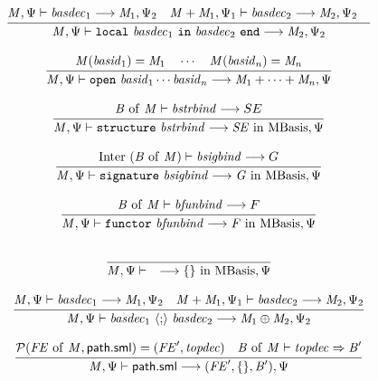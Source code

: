 \begin{equation}
{\frac{\displaystyle\strut{
\mathit{M}, \Psi  \vdash \mathit{basdec}_1 \longrightarrow \mathit{M}_1, \Psi_2 \quad
\mathit{M} + \mathit{M}_1, \Psi_1  \vdash \mathit{basdec}_2 \longrightarrow \mathit{M}_2, \Psi_2 \quad
}}{\displaystyle\strut{
\mathit{M}, \Psi  \vdash \mathtt{local}~ \mathit{basdec}_1 ~\mathtt{in}~ \mathit{basdec}_2 ~\mathtt{end} \longrightarrow \mathit{M}_2, \Psi_2
}}}
\end{equation}

\begin{equation}
{\frac{\displaystyle\strut{
\mathit{M}(\mathit{basid}_1) = \mathit{M}_1 \quad \cdots \quad
\mathit{M}(\mathit{basid}_n) = \mathit{M}_n 
}}{\displaystyle\strut{
\mathit{M}, \Psi  \vdash \mathtt{open}~ \mathit{basid}_1 \cdots \mathit{basid}_n \longrightarrow \mathit{M}_1 + \cdots + \mathit{M}_n, \Psi
}}}
\end{equation}

\begin{equation}
{\frac{\displaystyle\strut{
\mathit{B}~\mathrm{of}~\mathit{M} \vdash \mathit{bstrbind} \longrightarrow SE
}}{\displaystyle\strut{
\mathit{M}, \Psi  \vdash \mathtt{structure}~ \mathit{bstrbind}
\longrightarrow \mathit{SE} ~\mathrm{in}~ \mathrm{MBasis}, \Psi
}}}
\end{equation}

\begin{equation}
{\frac{\displaystyle\strut{
\mathrm{Inter}~(\mathit{B}~\mathrm{of}~\mathit{M}) \vdash \mathit{bsigbind} \longrightarrow G
}}{\displaystyle\strut{
\mathit{M}, \Psi  \vdash \mathtt{signature}~ \mathit{bsigbind}
\longrightarrow \mathit{G } ~\mathrm{in}~ \mathrm{MBasis}, \Psi
}}}
\end{equation}

\begin{equation}
{\frac{\displaystyle\strut{
\mathit{B}~\mathrm{of}~\mathit{M} \vdash \mathit{bfunbind} \longrightarrow F
}}{\displaystyle\strut{
\mathit{M}, \Psi  \vdash \mathtt{functor}~ \mathit{bfunbind}
\longrightarrow \mathit{F} ~\mathrm{in}~ \mathrm{MBasis}, \Psi
}}}
\end{equation}

\begin{equation}
{\frac{\displaystyle\strut{
}}{\displaystyle\strut{
\mathit{M}, \Psi  \vdash \quad \longrightarrow \{\} ~\mathrm{in}~ \mathrm{MBasis}, \Psi
}}}
\end{equation}

\begin{equation}
{\frac{\displaystyle\strut{
\mathit{M}, \Psi  \vdash \mathit{basdec}_1 \longrightarrow \mathit{M}_1, \Psi_2 \quad
\mathit{M} + \mathit{M}_1, \Psi_1  \vdash \mathit{basdec}_2 \longrightarrow \mathit{M}_2, \Psi_2 
}}{\displaystyle\strut{
\mathit{M}, \Psi  \vdash \mathit{basdec}_1 ~\langle\mathtt{;}\rangle~ \mathit{basdec}_2 \longrightarrow \mathit{M}_1 \oplus \mathit{M}_2, \Psi_2
}}}
\end{equation}

\begin{equation}
{\frac{\displaystyle\strut{
\mathcal{P}(\mathit{FE}~\mathrm{of}~\mathit{M}, \mathsf{path.sml}) = (\mathit{FE}', \mathit{topdec}) \quad
\mathit{B}~\mathrm{of}~\mathit{M} \vdash \mathit{topdec} \Rightarrow \mathit{B}'
}}{\displaystyle\strut{
\mathit{M}, \Psi  \vdash \mathsf{path.sml}  \longrightarrow (\mathit{FE}',\{\},\mathit{B}'), \Psi
}}}
\end{equation}


